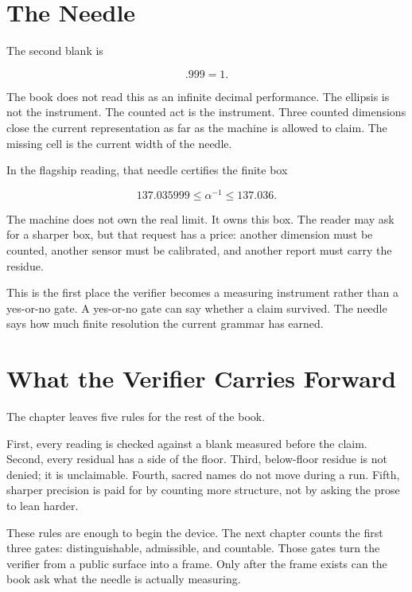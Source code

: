 \section{The Needle}

The second blank is

\[
.999 = 1 .
\]

The book does not read this as an infinite decimal performance. The ellipsis is
not the instrument. The counted act is the instrument. Three counted dimensions
close the current representation as far as the machine is allowed to claim.
The missing cell is the current width of the needle.

In the flagship reading, that needle certifies the finite box

\[
137.035999 \leq \alpha^{-1} \leq 137.036 .
\]

The machine does not own the real limit. It owns this box. The reader may ask
for a sharper box, but that request has a price: another dimension must be
counted, another sensor must be calibrated, and another report must carry the
residue.

This is the first place the verifier becomes a measuring instrument rather
than a yes-or-no gate. A yes-or-no gate can say whether a claim survived. The
needle says how much finite resolution the current grammar has earned.

\section{What the Verifier Carries Forward}

The chapter leaves five rules for the rest of the book.

First, every reading is checked against a blank measured before the claim.
Second, every residual has a side of the floor. Third, below-floor residue is
not denied; it is unclaimable. Fourth, sacred names do not move during a run.
Fifth, sharper precision is paid for by counting more structure, not by asking
the prose to lean harder.

These rules are enough to begin the device. The next chapter counts the first
three gates: distinguishable, admissible, and countable. Those gates turn the
verifier from a public surface into a frame. Only after the frame exists can
the book ask what the needle is actually measuring.


